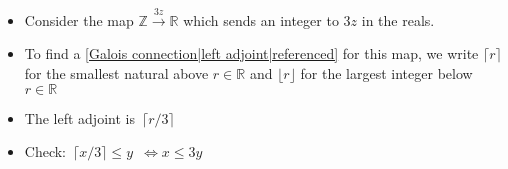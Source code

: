 

\begin{itemize}
    \item  Consider the map $\mathbb{Z} \xrightarrow{3z} \mathbb{R}$ which sends an integer to $3z$ in the reals.
    \item To find a \ref{Galois connection|left adjoint|referenced} for this map, we write $\lceil r \rceil$ for the smallest natural above $r \in \mathbb{R}$ and $\lfloor r \rfloor$ for the largest integer below $r \in \mathbb{R}$
    \item The left adjoint is \,$\lceil r/3 \rceil$\,
    \item Check: \,$\lceil x/3 \rceil \leq y$\, $\iff x \leq 3y$
  \end{itemize}
